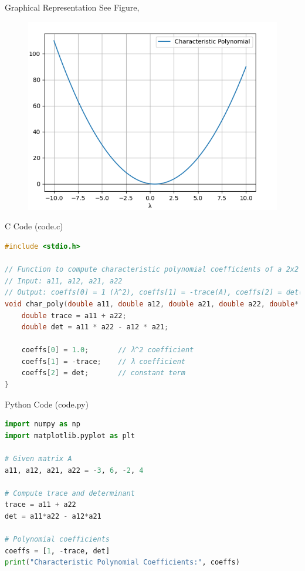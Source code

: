 \documentclass{beamer}
\begin{document}
\begin{frame}{Graphical Representation}
See Figure,
\begin{figure}[h!]
    \centering
    \includegraphics[height=0.5\textheight, keepaspectratio]{figs/fig.png}
    \label{figure_1}
\end{figure}
\end{frame}


\begin{frame}[fragile]{C Code (code.c)}
\begin{lstlisting}[language=C]
#include <stdio.h>

// Function to compute characteristic polynomial coefficients of a 2x2 matrix
// Input: a11, a12, a21, a22
// Output: coeffs[0] = 1 (λ^2), coeffs[1] = -trace(A), coeffs[2] = det(A)
void char_poly(double a11, double a12, double a21, double a22, double* coeffs) {
    double trace = a11 + a22;
    double det = a11 * a22 - a12 * a21;

    coeffs[0] = 1.0;       // λ^2 coefficient
    coeffs[1] = -trace;    // λ coefficient
    coeffs[2] = det;       // constant term
}
\end{lstlisting}
\end{frame}

\begin{frame}[fragile]{Python Code (code.py)}
\begin{lstlisting}[language=Python]
import numpy as np
import matplotlib.pyplot as plt

# Given matrix A
a11, a12, a21, a22 = -3, 6, -2, 4

# Compute trace and determinant
trace = a11 + a22
det = a11*a22 - a12*a21

# Polynomial coefficients
coeffs = [1, -trace, det]
print("Characteristic Polynomial Coefficients:", coeffs)

\end{lstlisting}
\end{frame}
\end{document}
